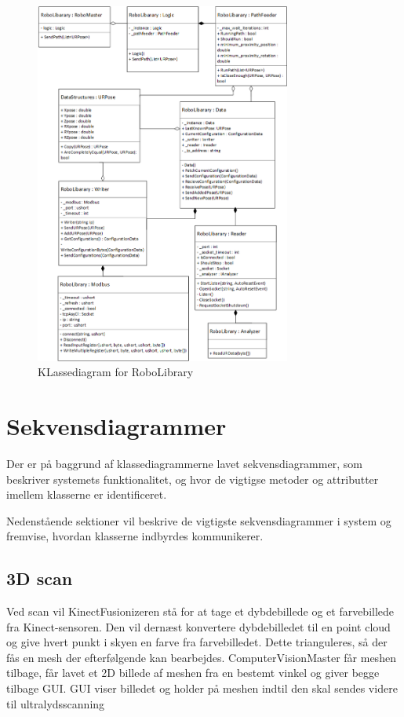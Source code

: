 \begin{figure}[H]
    \centering
    \includegraphics[width=0.75\textwidth]{figurer/d/Design/Class/uml_class_robolibrary}
    \caption{KLassediagram for RoboLibrary}
    \label{class_RoboLib}
\end{figure}





\newpage
\section{Sekvensdiagrammer}
Der er på baggrund af klassediagrammerne lavet sekvensdiagrammer, som beskriver systemets funktionalitet, og hvor de vigtigse metoder og attributter imellem klasserne er identificeret.

Nedenstående sektioner vil beskrive de vigtigste sekvensdiagrammer i system og fremvise, hvordan klasserne indbyrdes kommunikerer. 

\subsection{3D scan}
Ved scan vil KinectFusionizeren stå for at tage et dybdebillede og et farvebillede fra Kinect-sensoren.
Den vil dernæst konvertere dybdebilledet til en point cloud og give hvert punkt i skyen en farve fra farvebilledet.
Dette trianguleres, så der fås en mesh der efterfølgende kan bearbejdes. 
ComputerVisionMaster får meshen tilbage, får lavet et 2D billede af meshen fra en bestemt vinkel og giver begge tilbage GUI.
GUI viser billedet og holder på meshen indtil den skal sendes videre til ultralydsscanning

